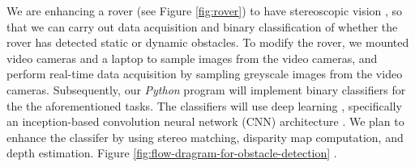 \documentclass[letter,12pt]{article}
\begin{document}
We are enhancing a rover (see Figure \ref{fig:rover}) to have stereoscopic vision \cite{Deshmukh2015}, so that we can carry out data acquisition and binary classification of whether the rover has detected static or dynamic obstacles. To modify the rover, we mounted video cameras and a laptop to sample images from the video cameras, and perform real-time data acquisition by sampling greyscale images from the video cameras. Subsequently, our {\it Python} program will implement binary classifiers for the the aforementioned tasks. The classifiers will use deep learning \cite{Buduma2017,Ketkar2017,Pattanayak2017,Goodfellow2016,Wang2016,Bengio2015,Cho2014,Goodfellow2014}, specifically an inception-based convolution neural network (CNN) architecture \cite{Szegedy2016}. We plan to enhance the classifer by using stereo matching, disparity map computation, and depth estimation. Figure \ref{fig:flow-dragram-for-obstacle-detection} \cite{Deshmukh2015}.


\end{document}
